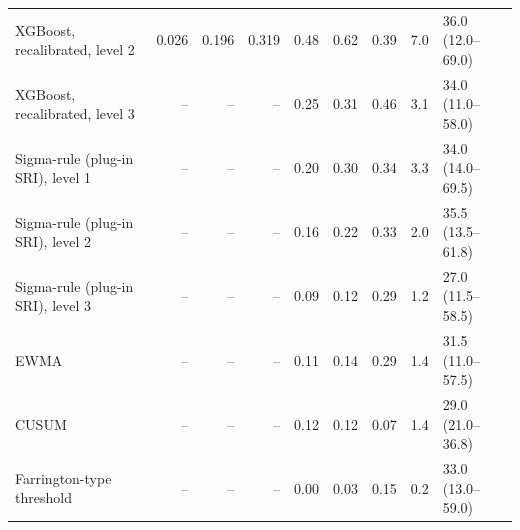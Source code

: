 \begin{minipage}{\linewidth}
\begin{tabular}{lrrrrrrrl}
XGBoost, recalibrated, level 2 & 0.026 & 0.196 & 0.319 & 0.48 & 0.62 & 0.39 & 7.0 & 36.0 (12.0--69.0) \\
XGBoost, recalibrated, level 3 & -- & -- & -- & 0.25 & 0.31 & 0.46 & 3.1 & 34.0 (11.0--58.0) \\
Sigma-rule (plug-in SRI), level 1 & -- & -- & -- & 0.20 & 0.30 & 0.34 & 3.3 & 34.0 (14.0--69.5) \\
Sigma-rule (plug-in SRI), level 2 & -- & -- & -- & 0.16 & 0.22 & 0.33 & 2.0 & 35.5 (13.5--61.8) \\
Sigma-rule (plug-in SRI), level 3 & -- & -- & -- & 0.09 & 0.12 & 0.29 & 1.2 & 27.0 (11.5--58.5) \\
EWMA & -- & -- & -- & 0.11 & 0.14 & 0.29 & 1.4 & 31.5 (11.0--57.5) \\
CUSUM & -- & -- & -- & 0.12 & 0.12 & 0.07 & 1.4 & 29.0 (21.0--36.8) \\
Farrington-type threshold & -- & -- & -- & 0.00 & 0.03 & 0.15 & 0.2 & 33.0 (13.0--59.0) \\
\bottomrule
\end{tabular}
\end{minipage}
\vspace{14pt}

